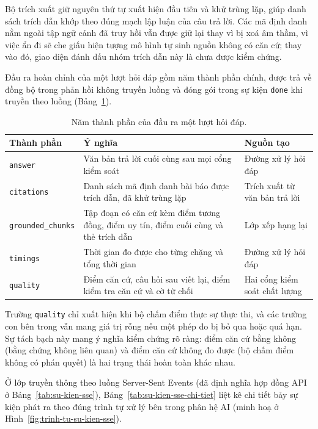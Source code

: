 Bộ trích xuất giữ nguyên thứ tự xuất hiện đầu tiên và khử trùng lặp, giúp danh sách trích dẫn khớp theo đúng mạch lập luận của câu trả lời. Các mã định danh nằm ngoài tập ngữ cảnh đã truy hồi vẫn được giữ lại thay vì bị xoá âm thầm, vì việc ẩn đi sẽ che giấu hiện tượng mô hình tự sinh nguồn không có căn cứ; thay vào đó, giao diện đánh dấu nhóm trích dẫn này là chưa được kiểm chứng.

Đầu ra hoàn chỉnh của một lượt hỏi đáp gồm năm thành phần chính, được trả về đồng bộ trong phản hồi không truyền luồng và đóng gói trong sự kiện \texttt{done} khi truyền theo luồng (Bảng~\ref{tab:thanh-phan-dau-ra}).

\begin{table}[htbp]
    \centering
    \caption{Năm thành phần của đầu ra một lượt hỏi đáp.}
    \label{tab:thanh-phan-dau-ra}
    \small
    \begin{tabularx}{\textwidth}{@{}>{\raggedright\arraybackslash}p{3.4cm}>{\raggedright\arraybackslash}X>{\raggedright\arraybackslash}p{3.8cm}@{}}
        \toprule
        \textbf{Thành phần} & \textbf{Ý nghĩa} & \textbf{Nguồn tạo} \\
        \midrule
        \texttt{answer} & Văn bản trả lời cuối cùng sau mọi cổng kiểm soát & Đường xử lý hỏi đáp \\
        \texttt{citations} & Danh sách mã định danh bài báo được trích dẫn, đã khử trùng lặp & Trích xuất từ văn bản trả lời \\
        \texttt{grounded\_chunks} & Tập đoạn có căn cứ kèm điểm tương đồng, điểm uy tín, điểm cuối cùng và thẻ trích dẫn & Lớp xếp hạng lại \\
        \texttt{timings} & Thời gian đo được cho từng chặng và tổng thời gian & Đường xử lý hỏi đáp \\
        \texttt{quality} & Điểm căn cứ, câu hỏi sau viết lại, điểm kiểm tra căn cứ và cờ từ chối & Hai cổng kiểm soát chất lượng \\
        \bottomrule
    \end{tabularx}
\end{table}

Trường \texttt{quality} chỉ xuất hiện khi bộ chấm điểm thực sự thực thi, và các trường con bên trong vẫn mang giá trị rỗng nếu một phép đo bị bỏ qua hoặc quá hạn. Sự tách bạch này mang ý nghĩa kiểm chứng rõ ràng: điểm căn cứ bằng không (bằng chứng không liên quan) và điểm căn cứ không đo được (bộ chấm điểm không có phán quyết) là hai trạng thái hoàn toàn khác nhau.

Ở lớp truyền thông theo luồng Server-Sent Events (đã định nghĩa hợp đồng API ở Bảng~\ref{tab:su-kien-sse}), Bảng~\ref{tab:su-kien-sse-chi-tiet} liệt kê chi tiết bảy sự kiện phát ra theo đúng trình tự xử lý bên trong phân hệ AI (minh hoạ ở Hình~\ref{fig:trinh-tu-su-kien-sse}).

